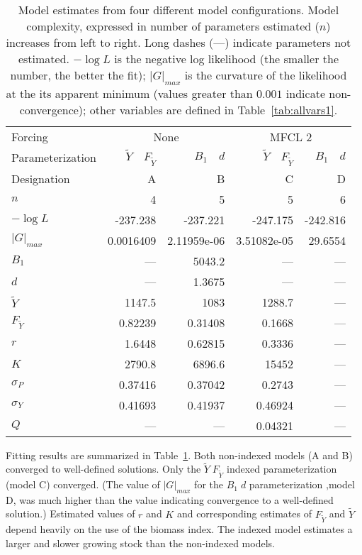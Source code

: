 \documentclass[12pt,letterpaper,twoside]{article}
\newcommand\MSY{\tilde{Y}}
\newcommand\Fmsy{F_{\MSY}}
\begin{document}
\begin{table}
\caption{
Model estimates from four different model configurations.
Model complexity, expressed in number of parameters estimated ($n$)
increases from left to right. Long dashes (---) indicate parameters
not estimated. 
{%
$-\log L$ is the negative log likelihood (the smaller the number, the
better the fit);
$|G|_{max}$ is the curvature of the likelihood at the its apparent
minimum (values greater than $0.001$ indicate non-convergence);
other variables are defined in Table~\ref{tab:allvars1}.
}
\label{tag:ests4}}
\begin{center}
\begin{tabular}{|l|rr|rr|}
\hline
Forcing & \multicolumn{2}{c|}{None}&\multicolumn{2}{c|}{MFCL 2}\\
\cline{2-3}\cline{4-5}
Parameterization&$\MSY\quad\Fmsy$&$B_1\quad d$&$\MSY\quad\Fmsy$&$B_1\quad d$\\
Designation& A & B& C& D\\
\hline
\hline
$n$ & 4 & 5 & 5 & 6\\
$-\log L$ & -237.238 & -237.221 & -247.175 & -242.816\\
$|G|_{max}$ & 0.0016409 & 2.11959e-06 & 3.51082e-05 & 29.6554\\
$B_1$ & --- & 5043.2 & --- & ---\\
$d$ & --- & 1.3675 & --- & ---\\
$\MSY$ & 1147.5 & 1083 & 1288.7 & ---\\
$\Fmsy$ & 0.82239 & 0.31408 & 0.1668 & ---\\
$r$ & 1.6448 & 0.62815 & 0.3336 & ---\\
$K$ & 2790.8 & 6896.6 & 15452 & ---\\
$\sigma_P$ & 0.37416 & 0.37042 & 0.2743 & ---\\
$\sigma_Y$ & 0.41693 & 0.41937 & 0.46924 & ---\\
$Q$ & --- & --- & 0.04321 & ---\\
\hline
\end{tabular}
\end{center}
\end{table}

Fitting results are summarized in Table~\ref{tag:ests4}.
Both non-indexed models (A and B) converged to well-defined solutions.
Only the $\MSY\;\Fmsy$ indexed parameterization (model C) converged. 
(The value of $|G|_{max}$ for the $B_1\; d$ parameterization ,model D,
was much higher than the value indicating convergence to a
well-defined solution.)
Estimated values of $r$ and $K$ and corresponding estimates of $\Fmsy$
and $\MSY$ depend heavily on the use of the biomass index. The
indexed model estimates a larger and slower growing stock than the
non-indexed models.
\end{document}
